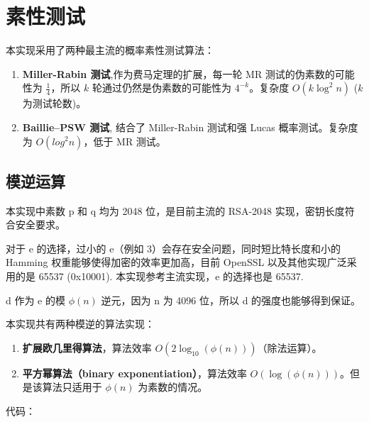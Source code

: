 \documentclass[degree=project,degree-type=project,cjk-font=noto]{thuthesis}
\begin{document}
\section{素性测试}

本实现采用了两种最主流的概率素性测试算法：

\begin{enumerate}
  \item \textbf{Miller-Rabin 测试},作为费马定理的扩展，每一轮 MR 测试的伪素数的可能性为 $\frac{1}{4}$，所以 $k$ 轮通过仍然是伪素数的可能性为 $4^{-k}$。复杂度 $O(k \log^2 n)$ ($k$ 为测试轮数)。
  \item \textbf{Baillie–PSW 测试}, 结合了 Miller-Rabin 测试和强 Lucas 概率测试。复杂度为 $O(log^2 n)$，低于 MR 测试。
\end{enumerate}

\subsection{模逆运算}

本实现中素数 p 和 q 均为 2048 位，是目前主流的 RSA-2048 实现，密钥长度符合安全要求。

对于 e 的选择，过小的 e（例如 3）会存在安全问题，同时短比特长度和小的 Hamming 权重能够使得加密的效率更加高，目前 OpenSSL 以及其他实现广泛采用的是 65537 (0x10001).
本实现参考主流实现，e 的选择也是 65537.

d 作为 e 的模 $\phi(n)$ 逆元，因为 n 为 4096 位，所以 d 的强度也能够得到保证。

本实现共有两种模逆的算法实现：

\begin{enumerate}
  \item \textbf{扩展欧几里得算法}，算法效率 $O(2 \log_{10}(\phi(n)))$（除法运算）。
  \item \textbf{平方幂算法（binary exponentiation）}，算法效率 $O(\log(\phi(n)))$。但是该算法只适用于 $\phi(n)$ 为素数的情况。
\end{enumerate}

代码：
\end{document}
